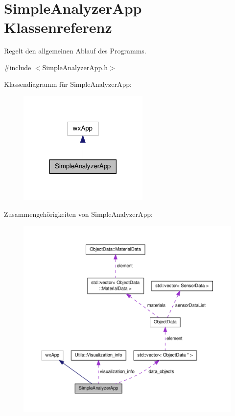 \hypertarget{classSimpleAnalyzerApp}{\section{Simple\-Analyzer\-App Klassenreferenz}
\label{classSimpleAnalyzerApp}
}


Regelt den allgemeinen Ablauf des Programms.  




{\ttfamily \#include $<$Simple\-Analyzer\-App.\-h$>$}



Klassendiagramm für Simple\-Analyzer\-App\-:\nopagebreak
\begin{figure}[H]
\begin{center}
\leavevmode
\includegraphics[width=182pt]{classSimpleAnalyzerApp__inherit__graph}
\end{center}
\end{figure}


Zusammengehörigkeiten von Simple\-Analyzer\-App\-:\nopagebreak
\begin{figure}[H]
\begin{center}
\leavevmode
\includegraphics[width=350pt]{classSimpleAnalyzerApp__coll__graph}
\end{center}
\end{figure}
